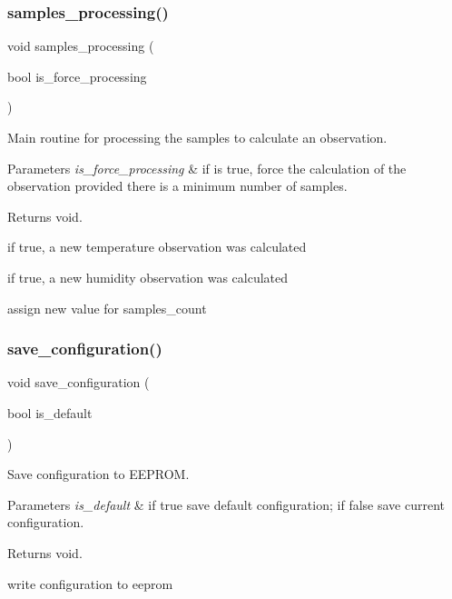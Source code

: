 \subsubsection{\texorpdfstring{samples\+\_\+processing()}{samples\_processing()}}
{\footnotesize\ttfamily void samples\+\_\+processing (\begin{DoxyParamCaption}\item[{bool}]{is\+\_\+force\+\_\+processing }\end{DoxyParamCaption})}



Main routine for processing the samples to calculate an observation. 


\begin{DoxyParams}{Parameters}
{\em is\+\_\+force\+\_\+processing} & if is true, force the calculation of the observation provided there is a minimum number of samples. \\
\hline
\end{DoxyParams}
\begin{DoxyReturn}{Returns}
void. 
\end{DoxyReturn}
if true, a new temperature observation was calculated

if true, a new humidity observation was calculated

assign new value for samples\+\_\+count \mbox{\label{i2c-th_8ino_afa979a8cb238fe81bf20654dfd6096ef}} 
\subsubsection{\texorpdfstring{save\+\_\+configuration()}{save\_configuration()}}
{\footnotesize\ttfamily void save\+\_\+configuration (\begin{DoxyParamCaption}\item[{bool}]{is\+\_\+default }\end{DoxyParamCaption})}



Save configuration to E\+E\+P\+R\+OM. 


\begin{DoxyParams}{Parameters}
{\em is\+\_\+default} & if true save default configuration; if false save current configuration. \\
\hline
\end{DoxyParams}
\begin{DoxyReturn}{Returns}
void. 
\end{DoxyReturn}
write configuration to eeprom \mbox{\label{i2c-th_8ino_ad3efe51e17cb8205a24267c2992a12d4}} 
